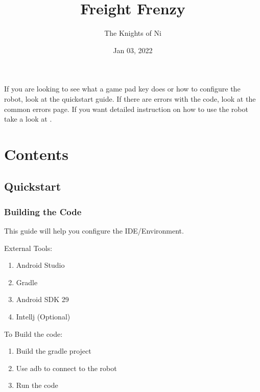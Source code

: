 \documentclass[letterpaper,10pt,english]{sphinxmanual}
\title{Freight Frenzy}
\date{Jan 03, 2022}
\author{The Knights of Ni}
\begin{document}
\pagestyle{empty}
\sphinxmaketitle
\pagestyle{plain}
\sphinxtableofcontents
\pagestyle{normal}
\label{\detokenize{index::doc}}


\sphinxAtStartPar
If you are looking to see what a game pad key does or how to configure the robot, look at the quickstart guide.
If there are errors with the code, look at the common errors page. If you want detailed instruction on how to use the
robot take a look at {\hyperref[\detokenize{game_pad::doc}]{}}.


\chapter{Contents}
\label{\detokenize{index:contents}}

\section{Quickstart}
\label{\detokenize{quickstart:quickstart}}\label{\detokenize{quickstart::doc}}

\subsection{Building the Code}
\label{\detokenize{quickstart:building-the-code}}
\sphinxAtStartPar
This guide will help you configure the IDE/Environment.

\sphinxAtStartPar
External Tools:
\begin{enumerate}
%
\item {} 
\sphinxAtStartPar
Android Studio

\item {} 
\sphinxAtStartPar
Gradle

\item {} 
\sphinxAtStartPar
Android SDK 29

\item {} 
\sphinxAtStartPar
Intellj (Optional)

\end{enumerate}

\sphinxAtStartPar
To Build the code:
\begin{enumerate}
%
\item {} 
\sphinxAtStartPar
Build the gradle project

\item {} 
\sphinxAtStartPar
Use adb to connect to the robot

\item {} 
\sphinxAtStartPar
Run the code

\end{enumerate}
\end{document}
